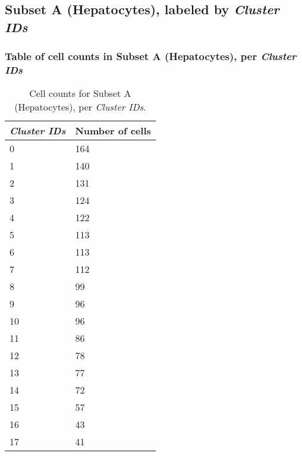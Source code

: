 \clearpage

\subsection{Subset A (Hepatocytes), labeled by \emph{Cluster IDs}}
\subsubsection{Table of cell counts in Subset A (Hepatocytes), per \emph{Cluster IDs}}\begin{table}[h]
\centering
\label{my-label}
\begin{tabular}{@{}ll@{}}
\toprule

\emph{Cluster IDs}& Number of cells \\ \midrule
0 & 164 \\

1 & 140 \\

2 & 131 \\

3 & 124 \\

4 & 122 \\

5 & 113 \\

6 & 113 \\

7 & 112 \\

8 & 99 \\

9 & 96 \\

10 & 96 \\

11 & 86 \\

12 & 78 \\

13 & 77 \\

14 & 72 \\

15 & 57 \\

16 & 43 \\

17 & 41 \\
\bottomrule
\end{tabular}
\caption{Cell counts for Subset A (Hepatocytes), per \emph{Cluster IDs}.}
\end{table}

